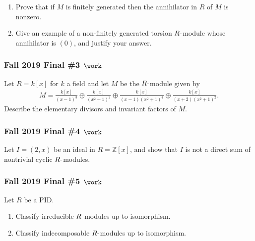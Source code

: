 \begin{enumerate}
\def\labelenumi{\alph{enumi}.}
\item
  Prove that if \(M\) is finitely generated then the annihilator in
  \(R\) of \(M\) is nonzero.
\item
  Give an example of a non-finitely generated torsion
  \(R{\hbox{-}}\)module whose annihilator is \((0)\), and justify your
  answer.
\end{enumerate}

\hypertarget{fall-2019-final-3-work}{%
\subsubsection{\texorpdfstring{Fall 2019 Final \#3
\(\work\)}{Fall 2019 Final \#3 \textbackslash work}}\label{fall-2019-final-3-work}}

Let \(R = k[x]\) for \(k\) a field and let \(M\) be the
\(R{\hbox{-}}\)module given by
\begin{align*}
M=\frac{k[x]}{(x-1)^{3}} \oplus \frac{k[x]}{\left(x^{2}+1\right)^{2}} \oplus \frac{k[x]}{(x-1)\left(x^{2}+1\right)^{4}} \oplus \frac{k[x]}{(x+2)\left(x^{2}+1\right)^{2}}
.\end{align*}
Describe the elementary divisors and invariant factors of \(M\).

\hypertarget{fall-2019-final-4-work}{%
\subsubsection{\texorpdfstring{Fall 2019 Final \#4
\(\work\)}{Fall 2019 Final \#4 \textbackslash work}}\label{fall-2019-final-4-work}}

Let \(I = (2, x)\) be an ideal in \(R = {\mathbb{Z}}[x]\), and show that
\(I\) is not a direct sum of nontrivial cyclic \(R{\hbox{-}}\)modules.

\hypertarget{fall-2019-final-5-work}{%
\subsubsection{\texorpdfstring{Fall 2019 Final \#5
\(\work\)}{Fall 2019 Final \#5 \textbackslash work}}\label{fall-2019-final-5-work}}

Let \(R\) be a PID.

\begin{enumerate}
\def\labelenumi{\alph{enumi}.}
\item
  Classify irreducible \(R{\hbox{-}}\)modules up to isomorphism.
\item
  Classify indecomposable \(R{\hbox{-}}\)modules up to isomorphism.
\end{enumerate}

